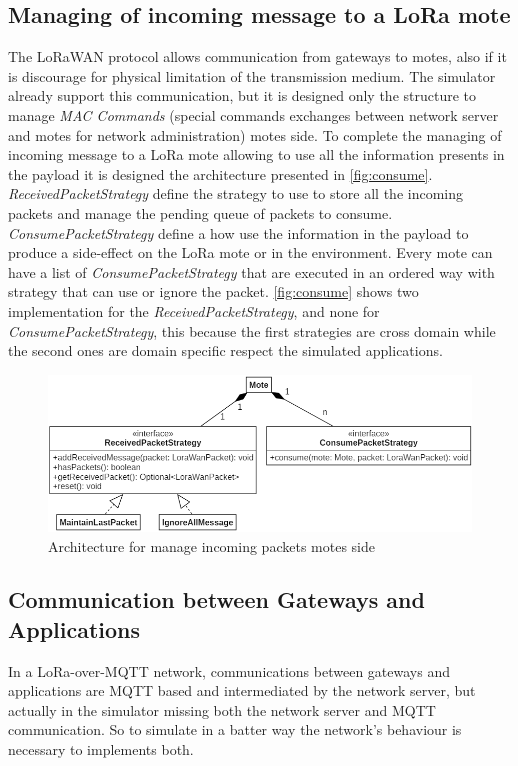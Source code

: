 \subsection{Managing of incoming message to a LoRa mote}
The LoRaWAN protocol allows communication from gateways to motes, also if it is discourage for physical limitation of the transmission medium. 
The simulator already support this communication, but it is designed only the structure to manage \textit{MAC Commands} (special commands exchanges between network server and motes for network administration) motes side.
To complete the managing of incoming message to a LoRa mote allowing to use all the information presents in the payload it is designed the architecture presented in \autoref{fig:consume}.
\mbox{\textit{ReceivedPacketStrategy}} define the strategy to use to store all the incoming packets and manage the pending queue of packets to consume.
\mbox{\textit{ConsumePacketStrategy}} define a how use the information in the payload to produce a side-effect on the LoRa mote or in the environment. 
Every mote can have a list of \mbox{\textit{ConsumePacketStrategy}} that are executed in an ordered way with strategy that can use or ignore the packet.
\autoref{fig:consume} shows two implementation for the \mbox{\textit{ReceivedPacketStrategy}}, and none for \mbox{\textit{ConsumePacketStrategy}}, this because the first strategies are cross domain while the second ones are domain specific respect the simulated applications.
\begin{figure}[h]
    \centering
    \includegraphics[width=\textwidth]{figures/consumePacket.png}
    \caption{Architecture for manage incoming packets motes side}
    \label{fig:consume}
\end{figure}

\subsection{Communication between Gateways and Applications}
In a LoRa-over-MQTT network, communications between gateways and applications are MQTT based and intermediated by the network server, but actually in the simulator missing both the network server and MQTT communication. 
So to simulate in a batter way the network's behaviour is necessary to implements both.

